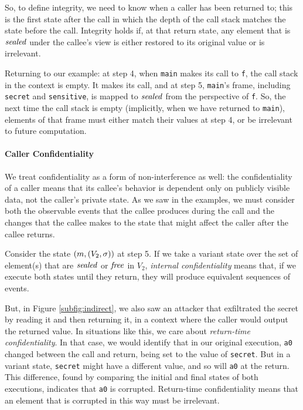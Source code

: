 \documentclass[10pt,conference]{ieeetran}%
\theoremstyle{definition}
\begin{document}
So, to define integrity, we need to know when a caller has been returned to;
this is the first state after the call in which the depth of the call stack
matches the state before the call. Integrity holds if, at that return state,
any element that is \(\mathit{sealed}\) under the callee's view is either restored
to its original value or is irrelevant.

Returning to our example: at step 4, when {\tt main} makes its call to {\tt f},
the call stack in the context is empty. It makes its call, and at step 5, {\tt main}'s
frame, including {\tt secret} and {\tt sensitive}, is mapped to \(\mathit{sealed}\) from the
perspective of {\tt f}. So, the next time the call stack is empty (implicitly, when
we have returned to {\tt main}), elements of that frame must either match their
values at step 4, or be irrelevant to future computation.

\paragraph*{Caller Confidentiality}

We treat confidentiality as a form of non-interference as well: the confidentiality of a caller
means that its callee's behavior is dependent only on publicly visible data,
not the caller's private state. 
As we saw in the examples, we must consider both the observable events
that the callee produces during the call and the changes that the callee makes to the state that might
affect the caller after the callee returns.

Consider the state \((m, (V_2,\sigma))\) at step 5. If we take a variant state over
the set of element(s) that are \(\mathit{sealed}\) or \(\mathit{free}\) in \(V_2\),
{\it internal confidentiality} means
that, if we execute both states until they return, they will produce equivalent sequences
of events.

But, in Figure \ref{subfig:indirect}, we also saw an attacker that exfiltrated the secret
by reading it and then returning it, in a context where the caller would output the returned
value. In situations like this, we care about {\it return-time confidentiality}.
In that case, we would identify that in our original execution, {\tt a0} changed between
the call and return, being set to the value of {\tt secret}. But in a variant state,
{\tt secret} might have a different value, and so will {\tt a0} at the return.
This difference, found by comparing the initial and final states of both executions,
indicates that {\tt a0} is corrupted. Return-time confidentiality means that
an element that is corrupted in this way must be irrelevant.
\end{document}
